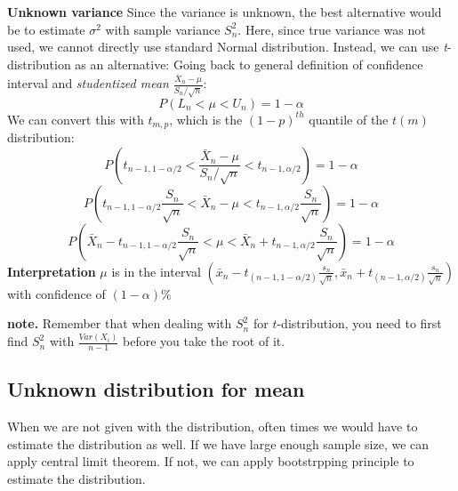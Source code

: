 \documentclass[a4paper]{article}
\begin{document}
\begin{mdframed}
    \textbf{Unknown variance}
    \newline
    Since the variance is unknown, the best alternative would be to estimate $\sigma^2$ with sample variance $S^2_n$.
    Here, since true variance was not used, we cannot directly use standard Normal distribution. Instead, we can use \textit{t}-distribution as an alternative:
    \newline
    Going back to general definition of confidence interval and \textit{studentized mean} $\frac{\bar{X}_n - {\mu}}{S_n/\sqrt{n}}$:
    $$P(L_n<\mu<U_n) = 1- \alpha$$
    We can convert this with $t_{m,p}$, which is the $(1-p)^{th}$ quantile of the $t(m)$ distribution:
    $$P(t_{n-1,1-\alpha/2}<\frac{\bar{X}_n - {\mu}}{S_n/\sqrt{n}}<t_{n-1,\alpha/2}) = 1-\alpha$$
    $$P(t_{n-1,1-\alpha/2}\frac{S_n}{\sqrt{n}}<{\bar{X}_n - {\mu}}<t_{n-1,\alpha/2}\frac{S_n}{\sqrt{n}}) = 1-\alpha$$
    $$P(\bar{X}_n-t_{n-1,1-\alpha/2}\frac{S_n}{\sqrt{n}}<\mu< \bar{X}_n+t_{n-1,\alpha/2}\frac{S_n}{\sqrt{n}}) = 1-\alpha$$
    \textbf{Interpretation}
    \newline
    $\mu$ is in the interval $(\bar{x}_n-t_{(n-1,1-\alpha/2)}\frac{s_n}{\sqrt{n}},\bar{x}_n+t_{(n-1,\alpha/2)}\frac{s_n}{\sqrt{n}})$ with confidence of $(1-\alpha)\%$
\end{mdframed}
\textbf{note.}
\newline
Remember that when dealing with $S^2_n$ for $t$-distribution, you need to first find $S^2_n$ with $\frac{Var(X_i)}{n-1}$ before you take the root of it.

\subsection{Unknown distribution for mean}
When we are not given with the distribution, often times we would have to estimate the distribution as well. If we have large enough sample size, we can apply central limit theorem. If not, we can apply bootstrpping principle to estimate the distribution.
\end{document}
